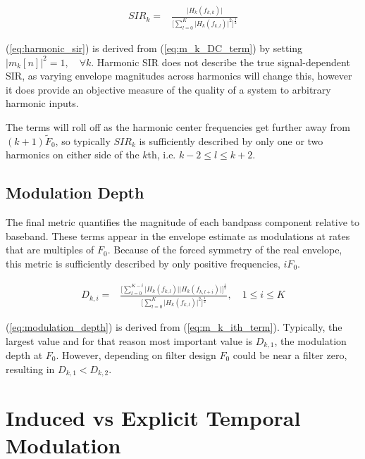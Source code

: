 \documentclass [11pt, proquest,oneside] {ganter_thesis}[2015/03/03]
\begin{document}
\begin{align}
\label{eq:harmonic_sir}
SIR_k =& \frac{\Big| H_k(f_{k,k}) \Big|} {\Bigg[ \sum\limits_{l=0}^K \Big|H_k(f_{k,l})\Big|^2 \Bigg] ^ \frac{1}{2}}
\end{align}

(\ref{eq:harmonic_sir}) is derived from (\ref{eq:m_k_DC_term}) by setting $\Big|m_k[n]\Big|^2 = 1, \quad \forall k$.  Harmonic SIR does not describe the true signal-dependent SIR, as varying envelope magnitudes across harmonics will change this, however it does provide an objective measure of the quality of a system to arbitrary harmonic inputs.

The terms will roll off as the harmonic center frequencies get further away from $(k+1)\tilde{F}_0$, so typically $SIR_k$ is sufficiently described by only one or two harmonics on either side of the $k$th, i.e. $k-2 \leq l \leq k+2$.



\subsection{Modulation Depth}

The final metric quantifies the magnitude of each bandpass component relative to baseband.  These terms appear in the envelope estimate as modulations at rates that are multiples of $F_0$.  Because of the forced symmetry of the real envelope, this metric is sufficiently described by only positive frequencies, $iF_0$.

\begin{align}
\label{eq:modulation_depth}
D_{k,i} =& \frac{\Bigg[ \sum\limits_{l=0}^{K-i} \Big|H_k(f_{k,l})\Big| \Big|H_k(f_{k,l+i})\Big|\Bigg]^\frac{1}{2}}
{\Bigg[ \sum\limits_{l=0}^K \Big|H_k(f_{k,l})\Big|^2 \Bigg] ^ \frac{1}{2}}, \quad 1 \leq i \leq K
\end{align}

(\ref{eq:modulation_depth}) is derived from (\ref{eq:m_k_ith_term}).  Typically, the largest value and for that reason most important value is $D_{k,1}$, the modulation depth at $F_0$.  However, depending on filter design $F_0$ could be near a filter zero, resulting in $D_{k,1} < D_{k,2}$.

\section{Induced vs Explicit Temporal Modulation}\label{section:inducedVexplicit}
\end{document}

